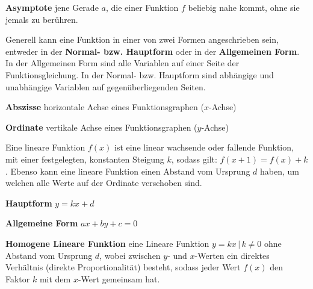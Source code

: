 \textbf{Asymptote}  jene Gerade $a$, die einer Funktion $f$ beliebig nahe kommt, ohne sie jemals zu ber\"{u}hren.

\begin{figure}[h!]
	\centering
\end{figure}

\pagebreak


Generell kann eine Funktion in einer von zwei Formen angeschrieben sein, entweder in der \textbf{Normal- bzw. Hauptform} oder in der \textbf{Allgemeinen Form}. In der Allgemeinen Form sind alle Variablen auf einer Seite der Funktionsgleichung. In der Normal- bzw. Hauptform sind abh\"{a}ngige und unabh\"{a}ngige Variablen auf gegen\"{u}berliegenden Seiten.

\textbf{Abszisse}  horizontale Achse eines Funktionsgraphen ($x$-Achse)

\textbf{Ordinate}  vertikale Achse eines Funktionsgraphen ($y$-Achse)


Eine lineare Funktion $f(x)$ ist eine linear wachsende oder fallende Funktion, mit einer festgelegten, konstanten Steigung $k$, sodass gilt: $f(x + 1) = f(x) + k$. Ebenso kann eine lineare Funktion einen Abstand vom Ursprung $d$ haben, um welchen alle Werte auf der Ordinate verschoben sind.

\textbf{Hauptform}  $y = kx + d$

\textbf{Allgemeine Form}  $ax + by + c = 0$

\textbf{Homogene Lineare Funktion}  eine Lineare Funktion $y = kx\,|\,k \neq 0$ ohne Abstand vom Ursprung $d$, wobei zwischen $y$- und $x$-Werten ein direktes Verh\"{a}ltnis (direkte Proportionalit\"{a}t) besteht, sodass jeder Wert $f(x)$ den Faktor $k$ mit dem $x$-Wert gemeinsam hat.

